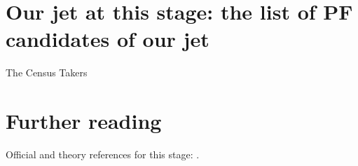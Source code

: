 \section{Our jet at this stage: the list of PF candidates of our jet}
\label{sec:census_takers:our_jet_at_this_stage_the_list_of_pf_can}

\begin{ledger}{The Census Takers}
\end{ledger}

\section{Further reading}
\label{sec:census_takers:further_reading}
Official and theory references for this stage: \cite{CMS:2017yfk}.

\begin{pitfalls}
\end{pitfalls}

\begin{exercises}
\item {}
\item {}
\end{exercises}

